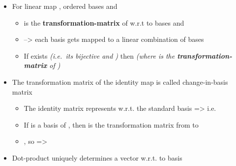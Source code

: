 \begin{itemize}

\item
  For linear map , ordered bases
  and

  \begin{itemize}
  
  \item
     is the
    \textbf{transformation-matrix} of  w.r.t to bases 
    and 
  \item
    --\textgreater{} each  basis gets mapped to a
    linear combination of  bases
  \item
    If  exists \emph{(i.e.~its bijective and )}
    then 
    \emph{(where  is the
    \textbf{transformation-matrix} of )}
  \end{itemize}
\item
  The transformation matrix of the identity map is called
  change-in-basis matrix

  \begin{itemize}
  
  \item
    The identity matrix  represents
     w.r.t. the standard
    basis
    =\textgreater{} i.e.~
  \item
    If 
    is a basis of , then
     is
    the transformation matrix from  to 
  \item
    , so =\textgreater{}
  \end{itemize}
\item
  Dot-product uniquely determines a vector w.r.t. to basis


\end{itemize}

